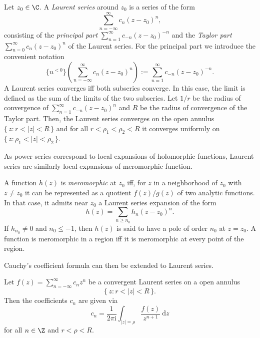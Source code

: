 \begin{definition}
  Let $z_{0} \in \C$. A \textit{Laurent series} around $z_{0}$ is a series of the form
  $$
    \sum_{n=-\infty}^{\infty}c_{n}(z-z_{0})^{n},
  $$
  consisting of the \textit{principal part} $\sum_{n=1}^{\infty}c_{-n}(z-z_{0})^{-n}$ and the \textit{Taylor part} $\sum_{n=0}^{\infty}c_{n}(z-z_{0})^{n}$ of the Laurent series. For the principal part we introduce the convenient notation
  $$
    \{u^{<0}\} 
    \left(
      \sum_{n=-\infty}^{\infty}c_{n}(z-z_{0})^{n}
    \right) := 
    \sum_{n=1}^{\infty}c_{-n}(z-z_{0})^{-n}.
  $$
  A Laurent series converges iff both subseries converge. In this case, the limit is defined as the sum of the limits of the two subseries. 
  Let $1/r$ be the radius of convergence of $\sum_{n=1}^{\infty}c_{-n}(z-z_{0})^n$ and $R$ be the radius of convergence of the Taylor part. Then, the Laurent series converges on the open annulus $\{\, z: r < |z| < R \,\}$ and for all $r < \rho_{1} < \rho_{2} < R$ it converges uniformly on $\{\, z: \rho_{1} < |z| < \rho_{2} \,\}$.
\end{definition}

As power series correspond to local expansions of holomorphic functions, Laurent series are similarly local expansions of meromorphic function.

\begin{definition}
  A function $h(z)$ is \textit{meromorphic} at $z_{0}$ iff, for $z$ in a neighborhood of $z_{0}$ with $z \neq z_{0}$ it can be represented as a quotient $f(z)/g(z)$ of two analytic functions. In that case, it admits near $z_{0}$ a Laurent series expansion of the form
  $$
    h(z) = \sum_{n \geq n_0}h_{n}(z-z_{0})^{n}.
  $$
  If $h_{n_{0}} \neq 0$ and $n_{0} \leq -1$, then $h(z)$ is said to have a pole of order $n_{0}$ at $z=z_{0}$.
  A function is meromorphic in a region iff it is meromorphic at every point of the region.
\end{definition}

Cauchy's coefficient formula can then be extended to Laurent series.

\begin{theorem}
  Let $f(z) = \sum_{n=-\infty}^{\infty}c_{n}z^{n}$ be a convergent Laurent series on a open annulus 
  $$
    \{\, z: r < |z| < R \,\}.
  $$ 
  Then the coefficients $c_{n}$ are given via
  $$
    c_{n} = \frac{1}{2\pi \mathrm{i}} \int_{|z|=\rho}\frac{f(z)}{z^{n+1}}~\mathrm{d}z
  $$
  for all $n \in \Z$ and $r < \rho < R$.
\end{theorem}

